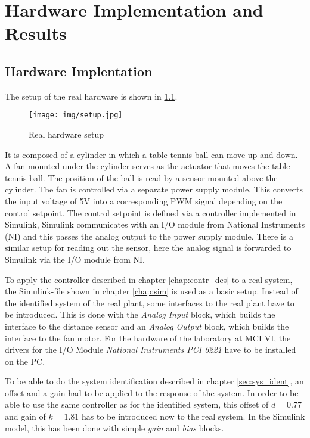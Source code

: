 \chapter{Hardware Implementation and Results}
\label{chapter:measurements}
\section{Hardware Implentation}
\label{sec:HI}
The setup of the real hardware is shown in \cref{fig:measurement_test_setup}.
\begin{figure}[htbp]
	\centering
	\texttt{[image: img/setup.jpg]}
	\caption{Real hardware setup}
	\label{fig:measurement_test_setup}
\end{figure}
It is composed of a cylinder in which a table tennis ball can move up and down. A fan mounted under the cylinder serves as the actuator that moves the table tennis ball. The position of the ball is read by a sensor mounted above the cylinder. 
The fan is controlled via a separate power supply module. This converts the input voltage of 5V into a corresponding PWM signal depending on the control setpoint. The control setpoint is defined via a controller implemented in Simulink, Simulink communicates with an I/O module from National Instruments (NI) and this passes the analog output to the power supply module. 
There is a similar setup for reading out the sensor, here the analog signal is forwarded to Simulink via the I/O module from NI. 

To apply the controller described in chapter \ref{chap:contr_des} to a real system, the Simulink-file shown in chapter \ref{chap:sim} is used as a basic setup. Instead of the identified system of the real plant, some interfaces to the real plant have to be introduced. This is done with the \textit{Analog Input} block, which builds the interface to the distance sensor and an \textit{Analog Output} block, which builds the interface to the fan motor. For the hardware of the laboratory at MCI VI, the drivers for the I/O Module \textit{National Instruments PCI 6221} have to be installed on the PC. 

To be able to do the system identification described in chapter \ref{sec:sys_ident}, an offset and a gain had to be applied to the response of the system. In order to be able to use the same controller as for the identified system, this offset of $d=0.77$ and gain of $k=1.81$ has to be introduced now to the real system. In the Simulink model, this has been done with simple \textit{gain} and \textit{bias} blocks. 

